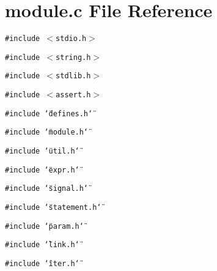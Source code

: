 \section{module.c File Reference}
\label{module_8c}
{\tt \#include $<$stdio.h$>$}\par
{\tt \#include $<$string.h$>$}\par
{\tt \#include $<$stdlib.h$>$}\par
{\tt \#include $<$assert.h$>$}\par
{\tt \#include \char`\"{}defines.h\char`\"{}}\par
{\tt \#include \char`\"{}module.h\char`\"{}}\par
{\tt \#include \char`\"{}util.h\char`\"{}}\par
{\tt \#include \char`\"{}expr.h\char`\"{}}\par
{\tt \#include \char`\"{}signal.h\char`\"{}}\par
{\tt \#include \char`\"{}statement.h\char`\"{}}\par
{\tt \#include \char`\"{}param.h\char`\"{}}\par
{\tt \#include \char`\"{}link.h\char`\"{}}\par
{\tt \#include \char`\"{}iter.h\char`\"{}}\par
